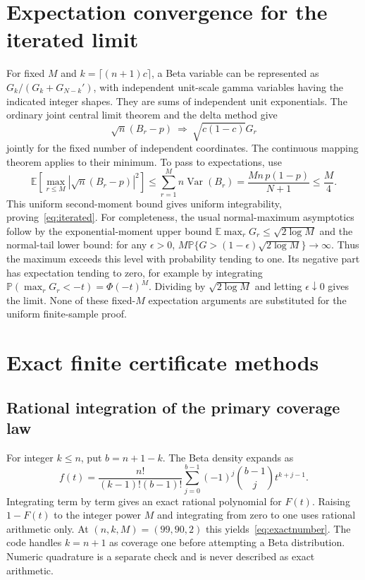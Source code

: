 \documentclass[10pt]{article}
\theoremstyle{definition}\newtheorem{definition}[theorem]{Definition}
\theoremstyle{remark}\newtheorem{remark}[theorem]{Remark}
\newcommand{\E}{\mathbb E}
\newcommand{\Prob}{\mathbb P}
\newcommand{\1}{\mathbf 1}
\begin{document}
\section{Expectation convergence for the iterated limit}\label{app:clt}
For fixed $M$ and $k=\lceil(n+1)c\rceil$, a Beta variable can be represented as $G_k/(G_k+G_{N-k}')$, with independent unit-scale gamma variables having the indicated integer shapes. They are sums of independent unit exponentials. The ordinary joint central limit theorem and the delta method give
\[
 \sqrt n(B_r-p)\ \Rightarrow\ \sqrt{c(1-c)}G_r
\]
jointly for the fixed number of independent coordinates. The continuous mapping theorem applies to their minimum. To pass to expectations, use
\[
 \E\left[\max_{r\le M}|\sqrt n(B_r-p)|^2\right]
 \le\sum_{r=1}^M n\operatorname{Var}(B_r)
 =\frac{Mn\,p(1-p)}{N+1}\le\frac M4.
\]
This uniform second-moment bound gives uniform integrability, proving~\eqref{eq:iterated}. For completeness, the usual normal-maximum asymptotics follow by the exponential-moment upper bound $\E\max_rG_r\le\sqrt{2\log M}$ and the normal-tail lower bound: for any $\epsilon>0$, $M\Prob\{G>(1-\epsilon)\sqrt{2\log M}\}\to\infty$. Thus the maximum exceeds this level with probability tending to one. Its negative part has expectation tending to zero, for example by integrating $\Prob(\max_rG_r<-t)=\Phi(-t)^M$. Dividing by $\sqrt{2\log M}$ and letting $\epsilon\downarrow0$ gives the limit. None of these fixed-$M$ expectation arguments are substituted for the uniform finite-sample proof.

\section{Exact finite certificate methods}\label{app:certificates}
\subsection{Rational integration of the primary coverage law}
For integer $k\le n$, put $b=n+1-k$. The Beta density expands as
\[
 f(t)=\frac{n!}{(k-1)!(b-1)!}\sum_{j=0}^{b-1}(-1)^j\binom{b-1}{j}t^{k+j-1}.
\]
Integrating term by term gives an exact rational polynomial for $F(t)$. Raising $1-F(t)$ to the integer power $M$ and integrating from zero to one uses rational arithmetic only. At $(n,k,M)=(99,90,2)$ this yields~\eqref{eq:exactnumber}. The code handles $k=n+1$ as coverage one before attempting a Beta distribution. Numeric quadrature is a separate check and is never described as exact arithmetic.
\end{document}
